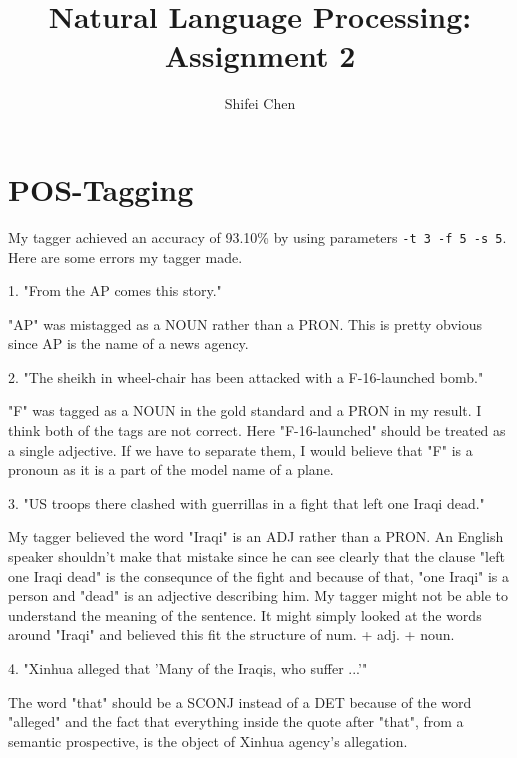 \documentclass[11pt]{article} %
\title{{\LARGE Natural Language Processing: Assignment 2}\\[1.5mm]} %
\author{Shifei Chen} %
\begin{document}
\maketitle

\section{POS-Tagging}

My tagger achieved an accuracy of 93.10\% by using parameters \texttt{-t 3 -f 5 -s 5}. Here are some errors my tagger made.

\begin{displayquote}
  1. "From the AP comes this story."
\end{displayquote}

"AP" was mistagged as a NOUN rather than a PRON. This is pretty obvious since AP is the name of a news agency.

\begin{displayquote}
  2. "The sheikh in wheel-chair has been attacked with a F-16-launched bomb."
\end{displayquote}

"F" was tagged as a NOUN in the gold standard and a PRON in my result. I think both of the tags are not correct. Here "F-16-launched" should be treated as a single adjective. If we have to separate them, I would believe that "F" is a pronoun as it is a part of the model name of a plane.

\begin{displayquote}
  3. "US troops there clashed with guerrillas in a fight that left one Iraqi dead."
\end{displayquote}

My tagger believed the word "Iraqi" is an ADJ rather than a PRON. An English speaker shouldn't make that mistake since he can see clearly that the clause "left one Iraqi dead" is the consequnce of the fight and because of that, "one Iraqi" is a person and "dead" is an adjective describing him. My tagger might not be able to understand the meaning of the sentence. It might simply looked at the words around "Iraqi" and believed this fit the structure of num. + adj. + noun.

\begin{displayquote}
  4. "Xinhua alleged that 'Many of the Iraqis, who suffer ...'"
\end{displayquote}

The word "that" should be a SCONJ instead of a DET because of the word "alleged" and the fact that everything inside the quote after "that", from a semantic prospective, is the object of Xinhua agency's allegation.
\end{document}
